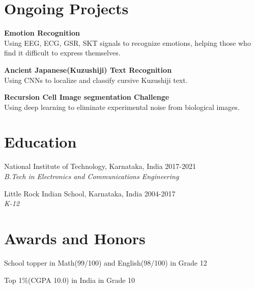 \documentclass[letterpaper]{article}
\renewenvironment{itemize}{
  \begin{list}{}{
    \setlength{\leftmargin}{1.5em}
  }
}{
  \end{list}
}
\begin{document}
\section*{Ongoing Projects}
  \begin{itemize}
    \item 
    \textbf{Emotion Recognition}\\
    Using EEG, ECG, GSR, SKT signals to recognize emotions, helping those who find it difficult to express themselves.
    \item 
    \textbf{Ancient Japanese(Kuzushiji) Text Recognition}\\
    Using CNNs to localize and classify cursive Kuzushiji text.
    \item 
    \textbf{Recursion Cell Image segmentation Challenge}\\
    Using deep learning to eliminate experimental noise from biological images.
  \end{itemize}

\section*{Education}
  \begin{itemize}
    \item National Institute of Technology, Karnataka, India\hfill 
    2017-2021
    \\
    {\sl B.Tech in Electronics and Communications Engineering}

    \item Little Rock Indian School, Karnataka, India\hfill
    2004-2017
    \\
    {\sl K-12}\hfill
  \end{itemize}

\section*{Awards and Honors}
\begin{itemize}
  \item School topper in Math(99/100) and English(98/100) in Grade 12
  \item Top 1\%(CGPA 10.0) in India in Grade 10
\end{itemize}

\end{document}
